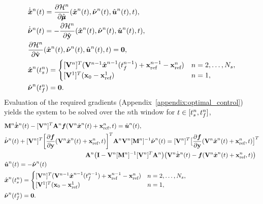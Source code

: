 \begin{align*}%
&\genstateDotArg{n}{t} = \frac{\partial \hamiltonianArg{n}}{\partial \adjointDiscreteDumArgnt{}{}}(\genstateArg{n}{t},\adjointOCArg{n}{t},\controllerArg{n}{t},t),\\%
&\adjointOCDotArg{n}{t}= - \frac{\partial \hamiltonianArg{n}}{\partial \genstateyDiscreteArgnt{}{}}(\genstateArg{n}{t},\adjointOCArg{n}{t},\controllerArg{n}{t},t),\\%
&\frac{\partial \hamiltonianArg{n}}{\partial \controllerDiscreteDumArgnt{}{}} (\genstateArg{n}{t},\adjointOCArg{n}{t},\controllerArg{n}{t},t) = \boldsymbol 0, \\
& \genstateArg{n}{\timeStartArg{n}} =
\begin{cases} \spatialIC & n = 2,\ldots,\nslabs,
 \\ \genstateICOne& n=1,\end{cases} \\
&\adjointOCArg{n}{\timeEndArg{n}}= \bz.
\end{align*}
Evaluation of the required gradients (Appendix~\ref{appendix:optimal_control}) yields the system to be solved over the $n$th window for $t \in [t_s^{n},t_f^{n}]$,
\begin{equation}\label{eq:sys_oc1}
\begin{split}
&\massArg{n}  \genstateDotArg{n}{t}  -  \basisspaceTArg{n} \stweightingMatArgt{n}{t} \velocity(\veloargsromn) =  \controllerArg{n}{t} , \\
 & \adjointOCDotArg{n}{t}  + \basisspaceTArg{n} \bigg[\frac{\partial \velocity}{\partial \stateyDiscrete} (\veloargsromn) \bigg]^T \stweightingMatArgt{n}{t} \basisspaceArg{n} [\massArg{n}]^{-1} \adjointOCArg{n}{t} =  \basisspaceTArg{n} \big[ \frac{\partial \velocity}{\partial \stateyDiscrete}(\veloargsromn) \big]^T \\
& \hspace{1.8in} \stweightingMatArgt{n}{t} \big( \mathbf{I} -   \basisspaceArg{n} [\massArg{n}]^{-1} \basisspaceTArg{n}  \stweightingMatArgt{n}{t} \big)  \big( \basisspaceArg{n}\genstateDotArg{n}{t}  -   \velocity(\veloargsromn) \big) \\%
&\controllerArg{n}{t} = -\adjointOCArg{n}{t} \\%
& \genstateArg{n}{\timeStartArg{n}} = 
\begin{cases}
\spatialIC& n=2,\ldots,\nslabs, \\
\genstateICOne & n=1,  
\end{cases} \\%
& \adjointOCArg{n}{\timeEndArg{n}} = \boldsymbol 0. \\%
\end{split}
\end{equation}
